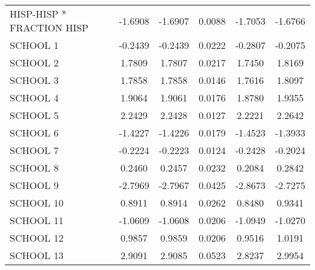 \documentclass[12pt,letterpaper]{article}
\begin{document}
\begin{small}
\begin{table}[ht]
\begin{tabular}{l|ccccc}
  HISP-HISP * FRACTION HISP & -1.6908 & -1.6907 & 0.0088 & -1.7053 & -1.6766 \\ 
  SCHOOL 1 & -0.2439 & -0.2439 & 0.0222 & -0.2807 & -0.2075 \\ 
  SCHOOL 2 & 1.7809 & 1.7807 & 0.0217 & 1.7450 & 1.8169 \\ 
  SCHOOL 3 & 1.7858 & 1.7858 & 0.0146 & 1.7616 & 1.8097 \\ 
  SCHOOL 4 & 1.9064 & 1.9061 & 0.0176 & 1.8780 & 1.9355 \\ 
  SCHOOL 5 & 2.2429 & 2.2428 & 0.0127 & 2.2221 & 2.2642 \\ 
  SCHOOL 6 & -1.4227 & -1.4226 & 0.0179 & -1.4523 & -1.3933 \\ 
  SCHOOL 7 & -0.2224 & -0.2223 & 0.0124 & -0.2428 & -0.2024 \\ 
  SCHOOL 8 & 0.2460 & 0.2457 & 0.0232 & 0.2084 & 0.2842 \\ 
  SCHOOL 9 & -2.7969 & -2.7967 & 0.0425 & -2.8673 & -2.7275 \\ 
  SCHOOL 10 & 0.8911 & 0.8914 & 0.0262 & 0.8480 & 0.9341 \\ 
  SCHOOL 11 & -1.0609 & -1.0608 & 0.0206 & -1.0949 & -1.0270 \\ 
  SCHOOL 12 & 0.9857 & 0.9859 & 0.0206 & 0.9516 & 1.0191 \\ 
  SCHOOL 13 & 2.9091 & 2.9085 & 0.0523 & 2.8237 & 2.9954 \\ 
   \hline
\end{tabular}
\end{table}

\end{small}
\end{document}
